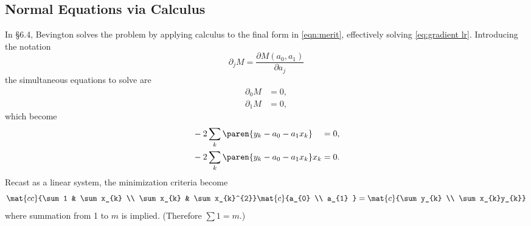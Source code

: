 \subsection{\label{ssec:Normal Equations via Calculus}Normal Equations via Calculus}  %
In \S 6.4, Bevington solves the problem by applying calculus to the final form in \eqref{eqn:merit}, effectively solving \eqref{eq:gradient lr}. Introducing the notation
  \begin{equation*}   %
       \partial_{j} M = \frac{\partial M(a_{0}, a_{1})}{\partial a_{j}}
  \end{equation*}
the simultaneous equations to solve are
\begin{equation}
  \begin{split}
    \partial_{0} M &= 0, \\
    \partial_{1} M &= 0,
  \end{split}
\end{equation}
which become
\begin{equation}
  \begin{split}
    &-2 \sum_{k} \paren{y_{k} - a_{0} - a_{1}x_{k}} \phantom{x_{k}} = 0, \\
    &-2 \sum_{k} \paren{y_{k} - a_{0} - a_{1}x_{k}} x_{k}  = 0.
  \end{split}
\end{equation}
Recast as a linear system, the minimization criteria become
  \begin{equation*}   %
      \mat{cc}{\sum 1 & \sum x_{k} \\ \sum x_{k} & \sum x_{k}^{2}}
      \mat{c}{a_{0} \\ a_{1} } = 
      \mat{c}{\sum y_{k} \\ \sum x_{k}y_{k}}
  \end{equation*}
where summation from 1 to $m$ is implied. (Therefore $\sum 1 = m$.)

